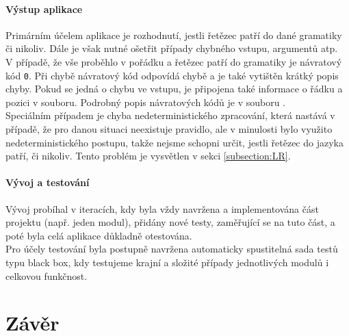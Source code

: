 \subsubsection*{Výstup aplikace}

Primárním účelem aplikace je rozhodnutí, jestli řetězec patří do dané
gramatiky či nikoliv. Dále je však nutné ošetřit případy chybného vstupu,
argumentů atp.\\

V případě, že vše proběhlo v pořádku a řetězec patří do gramatiky je návratový
kód \texttt{0}. Při chybě návratový kód odpovídá chybě a je také vytištěn krátký
popis chyby. Pokud se jedná o chybu ve vstupu, je připojena také informace o
řádku a pozici v souboru. Podrobný popis návratových kódů je v souboru .\\

Speciálním případem je chyba nedeterministického zpracování, která nastává
v případě, že pro danou situaci neexistuje pravidlo, ale v minulosti
bylo využito nedeterministického postupu, takže nejsme schopni určit, jestli
řetězec do jazyka patří, či nikoliv. Tento problém je vysvětlen v sekci
\ref{subsection:LR}.

\subsubsection*{Vývoj a testování}

Vývoj probíhal v iteracích, kdy byla vždy navržena a implementována část
projektu (např. jeden modul), přidány nové testy, zaměřující se na
tuto část, a poté byla celá aplikace důkladně otestována.\\

Pro účely testování byla postupně navržena automaticky spustitelná sada testů
typu black box, kdy testujeme krajní a složité případy jednotlivých modulů
i celkovou funkčnost.

\chapter{Závěr}

